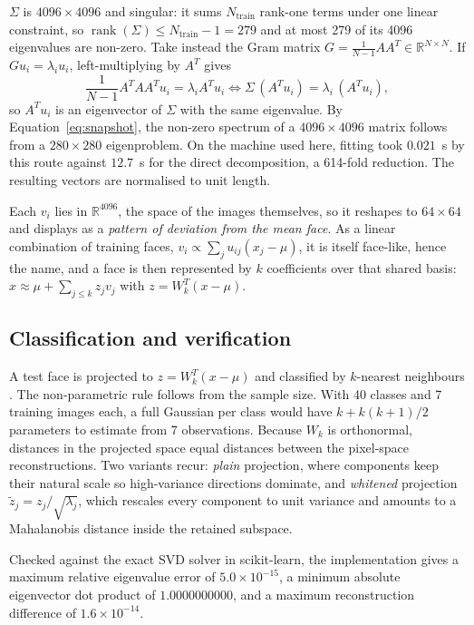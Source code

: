 \documentclass[10pt,a4paper]{article}
\begin{document}
$\Sigma$ is $4096\times4096$ and singular: it sums $N_{\text{train}}$ rank-one
terms under one linear constraint, so
$\operatorname{rank}(\Sigma)\le N_{\text{train}}-1=279$ and at most 279 of its
4096 eigenvalues are non-zero. Take instead the Gram matrix
$G=\frac{1}{N-1}AA^{T}\in\mathbb{R}^{N\times N}$. If $Gu_i=\lambda_i u_i$,
left-multiplying by $A^{T}$ gives
\begin{equation}
\frac{1}{N-1}A^{T}AA^{T}u_i=\lambda_i A^{T}u_i
\iff \Sigma\,(A^{T}u_i)=\lambda_i\,(A^{T}u_i),
\label{eq:snapshot}
\end{equation}
so $A^{T}u_i$ is an eigenvector of $\Sigma$ with the same eigenvalue. By
Equation~\eqref{eq:snapshot}, the non-zero spectrum of a $4096\times4096$
matrix follows from a $280\times280$ eigenproblem. On the machine used here,
fitting took $0.021$~s by this route against $12.7$~s for the direct
decomposition, a 614-fold reduction. The resulting vectors are normalised to
unit length.

Each $v_i$ lies in $\mathbb{R}^{4096}$, the space of the images themselves, so
it reshapes to $64\times64$ and displays as a \emph{pattern of deviation from
the mean face}. As a linear combination of training faces,
$v_i\propto\sum_j u_{ij}(x_j-\mu)$, it is itself face-like, hence the name, and a
face is then represented by $k$ coefficients over that shared
basis: $x\approx\mu+\sum_{j\le k} z_jv_j$ with $z=W_k^{T}(x-\mu)$.

\subsection{Classification and verification}

A test face is projected to $z=W_k^{T}(x-\mu)$ and classified by $k$-nearest
neighbours \citep{duda2001}. The non-parametric rule follows from the sample
size. With 40 classes and 7 training images each, a full Gaussian per class
would have $k+k(k+1)/2$ parameters to estimate from 7 observations. Because $W_k$ is
orthonormal, distances in the projected space equal distances between the
pixel-space reconstructions. Two variants recur: \emph{plain} projection,
where components keep their natural scale so high-variance directions dominate,
and \emph{whitened} projection $\tilde z_j=z_j/\sqrt{\lambda_j}$, which
rescales every component to unit variance and amounts to a Mahalanobis distance
inside the retained subspace.

Checked against the exact SVD solver in scikit-learn, the implementation gives a
maximum relative eigenvalue error of $5.0\times10^{-15}$, a minimum absolute
eigenvector dot product of $1.0000000000$, and a maximum reconstruction
difference of $1.6\times10^{-14}$.
\end{document}

